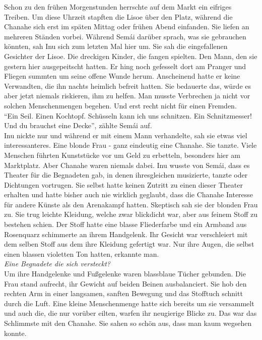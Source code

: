 Schon zu den frühen Morgenstunden herrschte auf dem Markt ein eifriges Treiben. Um diese Uhrzeit 
stapften die Lisoe über den Platz, während die Chanahe sich erst im späten Mittag oder frühen Abend 
einfanden. Sie liefen an mehreren Ständen vorbei. Während Semái darüber sprach, was sie gebrauchen 
könnten, sah Inu sich zum letzten Mal hier um. Sie sah die eingefallenen Gesichter der Lisoe. Die 
dreckigen Kinder, die fangen spielten. Den Mann, den sie gestern hier ausgepeitscht hatten. Er hing 
noch gefesselt dort am Pranger und Fliegen summten um seine offene Wunde herum. Anscheinend hatte 
er keine Verwandten, die ihn nachts heimlich befreit hatten. Sie bedauerte das, würde es aber jetzt 
niemals riskieren, ihm zu helfen. Man musste Verbrechen ja nicht vor solchen Menschenmengen 
begehen. Und erst recht nicht für einen Fremden. \\
``Ein Seil. Einen Kochtopf. Schüsseln kann ich uns schnitzen. Ein Schnitzmesser! Und du brauchst 
eine Decke'', zählte Semái auf.\\
Inu nickte nur und während er mit einem Mann verhandelte, sah sie etwas viel interessanteres. Eine 
blonde Frau - ganz eindeutig eine Chanahe. Sie tanzte. Viele Menschen führten Kunststücke vor um 
Geld zu erbetteln, besonders hier am Marktplatz. Aber Chanahe waren niemals dabei. Inu wusste von 
Semái, dass es Theater für die Begnadeten gab, in denen ihresgleichen musizierte, tanzte oder 
Dichtungen vortrugen. Sie selbst hatte keinen Zutritt zu einen dieser Theater erhalten und hatte 
bisher auch nie wirklich geglaubt, dass die Chanahe Interesse für andere Künste als den Arenakampf 
hatten. Skeptisch sah sie der blonden Frau zu. Sie trug leichte Kleidung, welche zwar blickdicht 
war, aber aus feinem Stoff zu bestehen schien. Der Stoff hatte eine blasse Fliederfarbe und ein 
Armband aus Rosenquarz schimmerte an ihrem Handgelenk. Ihr Gesicht war verschleiert mit dem selben 
Stoff aus dem ihre Kleidung gefertigt war. Nur ihre Augen, die selbst einen blassen violetten Ton 
hatten, erkannte man. \\
\textit{Eine Begnadete die sich versteckt?}\\
Um ihre Handgelenke und Fußgelenke waren blassblaue Tücher gebunden. Die Frau stand aufrecht, ihr 
Gewicht auf beiden Beinen ausbalanciert. Sie hob den rechten Arm in einer langsamen, sanften 
Bewegung und das Stofftuch schnitt durch die Luft. Eine kleine Menschenmenge hatte sich bereits um 
sie versammelt und auch die, die nur vorüber eilten, warfen ihr neugierige Blicke zu. 
Das war das Schlimmste mit den Chanahe. Sie sahen so schön aus, dass man kaum wegsehen konnte. 
